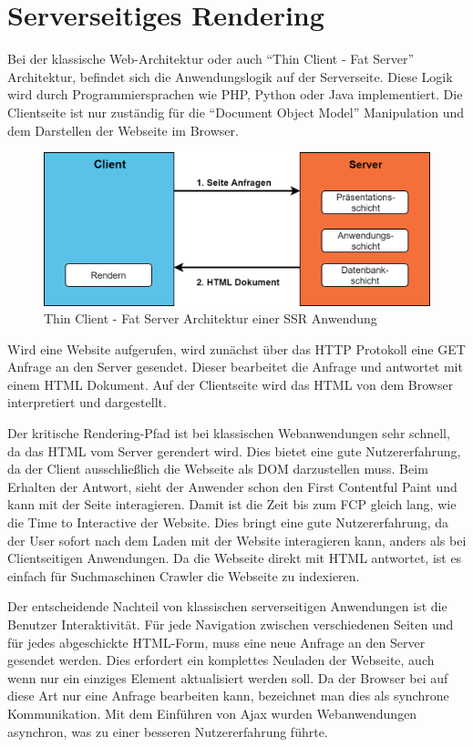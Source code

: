 \documentclass[runningheads]{llncs}
\begin{document}
\section{Serverseitiges Rendering}
\label{sec:Serverseitiges Rendering}
Bei der klassische Web-Architektur oder auch “Thin Client - Fat Server” 
Architektur, befindet sich die Anwendungslogik auf der Serverseite. 
Diese Logik wird durch Programmiersprachen wie PHP, Python oder Java 
implementiert. Die Clientseite ist nur zuständig für die “Document Object Model” 
Manipulation und dem Darstellen der Webseite im Browser.
\begin{figure}[h]
  \centering
  \includegraphics[width=12cm]{images/server}
  \caption{Thin Client - Fat Server Architektur einer SSR Anwendung}
  \label{Thin Client - Fat Server Architektur einer SSR Anwendung}
\end{figure}

Wird eine Website aufgerufen, wird zunächst über das HTTP Protokoll 
eine GET Anfrage an den Server gesendet. Dieser bearbeitet die Anfrage 
und antwortet mit einem HTML Dokument. Auf der Clientseite wird das HTML 
von dem Browser interpretiert und dargestellt.

Der kritische Rendering-Pfad ist bei klassischen Webanwendungen sehr schnell, 
da das HTML vom Server gerendert wird. Dies bietet eine gute Nutzererfahrung, 
da der Client ausschließlich die Webseite als DOM darzustellen muss. 
Beim Erhalten der Antwort, sieht der Anwender schon den First Contentful Paint 
und kann mit der Seite interagieren. Damit ist die Zeit bis zum FCP gleich lang, 
wie die Time to Interactive der Website. Dies bringt eine gute Nutzererfahrung, 
da der User sofort nach dem Laden mit der Website interagieren kann, 
anders als bei Clientseitigen Anwendungen. 
Da die Webseite direkt mit HTML antwortet, ist es einfach für Suchmaschinen Crawler 
die Webseite zu indexieren. 

Der entscheidende Nachteil von klassischen serverseitigen Anwendungen 
ist die Benutzer Interaktivität. Für jede Navigation zwischen verschiedenen 
Seiten und für jedes abgeschickte HTML-Form, 
muss eine neue Anfrage an den Server gesendet werden. 
Dies erfordert ein komplettes Neuladen der Webseite, 
auch wenn nur ein einziges Element aktualisiert werden soll. 
Da der Browser bei auf diese Art nur eine Anfrage bearbeiten kann, 
bezeichnet man dies als synchrone Kommunikation. 
Mit dem Einführen von Ajax wurden Webanwendungen asynchron, 
was zu einer besseren Nutzererfahrung führte.
\end{document}
